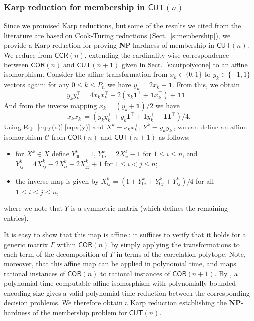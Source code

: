 \documentclass[envcountsect,envcountsame]{svjour3}
\theoremstyle{changebreak}                %
\newcommand{\transpose}[1]{{#1}^{\top}}
\newcommand{\COR}[1]{\mathsf{COR}(#1)}
\newcommand{\CUT}[1]{\mathsf{CUT}(#1)}
\begin{document}
\subsubsection{Karp reduction for membership in $\CUT{n}$}
\label{s:karpred}
Since we promised Karp reductions, but some of the results we cited from the literature are based on Cook-Turing reductions (Sect.~\ref{s:membership}), we provide a Karp reduction for proving \textbf{NP}-hardness of membership in $\CUT{n}$. We reduce from $\COR{n}$, extending the cardinality-wise correspondence between $\COR{n}$ and $\CUT{n+1}$ given in Sect.~\ref{s:cutpolycone} to an affine isomorphism. Consider the affine transformation from $x_k\in\{0,1\}$ to $y_k\in\{-1,1\}$ vectors again: for any $0\le k\le P_n$ we have $y_k=2x_k-\mathbf{1}$. From this, we obtain
\begin{equation}
  y_k\transpose{y}_k=4x_k\transpose{x}_k-2(x_k\transpose{\mathbf{1}}+\mathbf{1}\transpose{x}_k)+\mathbf{1}\transpose{\mathbf{1}}.
  \label{eq:y(x)}
\end{equation}
And from the inverse mapping $x_k=(y_k+\mathbf{1})/2$ we have
\begin{equation}
  x_k\transpose{x}_k=(y_k\transpose{y}_k+y_k\transpose{\mathbf{1}}+\mathbf{1}\transpose{y}_k + \mathbf{1}\transpose{\mathbf{1}})/4.
  \label{eq:x(y)}
\end{equation}
Using Eq.~\eqref{eq:y(x)}-\eqref{eq:x(y)} and $X^k=x_k\transpose{x}_k$, $Y^k=y_k\transpose{y}_k$, we can define an affine isomorphism $\mathscr{C}$ from $\COR{n}$ and $\CUT{n+1}$ as follows:
\begin{itemize}
\item for $X^k\in X$ define $Y^k_{00}=1$, $Y^k_{0i}=2X^k_{ii}-1$ for $1\le i\le n$, and $Y^k_{ij}=4X^k_{ij}-2X^k_{ii}-2X^k_{jj}+1$ for $1\le i<j\le n$;
\item the inverse map is given by $X^k_{ij}=(1+Y^k_{0i}+Y^k_{0j} + Y^k_{ij})/4$ for all $1\le i\le j\le n$,
\end{itemize}
where we note that $Y$ is a symmetric matrix (which defines the remaining entries).

It is easy to show that this map is affine \cite{desimone90}: it suffices to verify that it holds for a generic matrix $\Gamma$ within $\COR{n}$ by simply applying the transformations to each term of the decomposition of $\Gamma$ in terms of the correlation polytope. Note, moreover, that this affine map can be applied in polynomial time, and maps rational instances of $\COR{n}$ to rational instances of $\COR{n+1}$. By \cite{gls}, a polynomial-time computable affine isomorphism with polynomially bounded encoding size gives a valid polynomial-time reduction between the corresponding decision problems. We therefore obtain a Karp reduction establishing the \textbf{NP}-hardness of the membership problem for $\CUT{n}$.
\end{document}
